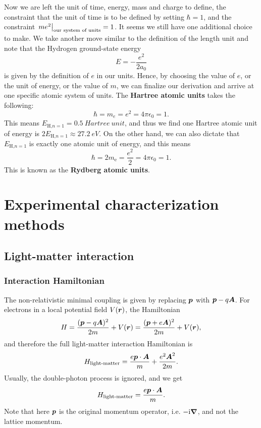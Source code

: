 \documentclass[hyperref, a4paper, 12pt]{report}
\newcommand*{\ii}{\mathrm{i}}
\newcommand*{\concept}[1]{{\textbf{#1}}}
\begin{document}
Now we are left the unit of time, energy, mass and charge to define, 
the constraint that the unit of time is to be defined by setting $\hbar = 1$,
and the constraint $\eval{m e^2}_{\text{our system of units}} = 1$.
It seems we still have one additional choice to make. 
We take another move similar to the definition of the length unit 
and note that the Hydrogen ground-state energy 
\begin{equation}
    E = - \frac{e^2}{2a_0}
\end{equation}
is given by the definition of $e$ in our units.
Hence, by choosing the value of $e$, 
or the unit of energy, or the value of $m$, 
we can finalize our derivation and arrive at one specific atomic system of units.
The \concept{Hartree atomic units} takes the following:
\begin{equation}
    \hbar = m_e = e^2 = 4 \pi \epsilon_0 = 1.
\end{equation}
This means $E_{\text{H,$n=1$}} = \SI{0.5}{Hartree \ unit}$,
and thus we find one Hartree atomic unit of energy 
is $2 E_{\text{H,$n=1$}} \approx \SI{27.2}{eV}$.
On the other hand, we can also dictate that $E_{\text{H,$n=1$}}$
is exactly one atomic unit of energy, 
and this means 
\begin{equation}
    \hbar = 2 m_{\text{e}} = \frac{e^2}{2} = 4 \pi \epsilon_0 = 1.
\end{equation}
This is known as the \concept{Rydberg atomic units}.

\chapter{Experimental characterization methods}

\section{Light-matter interaction}

\subsection{Interaction Hamiltonian}

The non-relativistic minimal coupling is given by replacing $\vb*{p}$ with $\vb*{p} - q \vb*{A}$.
For electrons in a local potential field $V(\vb*{r})$, 
the Hamiltonian 
\begin{equation}
    H = \frac{(\vb*{p} - q \vb*{A})^2}{2m} + V(\vb*{r}) = \frac{(\vb*{p} + e \vb*{A})^2}{2m} + V(\vb*{r}),
\end{equation}
and therefore the full light-matter interaction Hamiltonian is 
\begin{equation}
    H_{\text{light-matter}} = \frac{e \vb*{p} \cdot \vb*{A}}{m} + \frac{e^2 \vb*{A}^2}{2m}.
\end{equation}
Usually, the double-photon process is ignored, and we get 
\begin{equation}
    H_{\text{light-matter}} = \frac{e \vb*{p} \cdot \vb*{A}}{m}.
    \label{eq:light-matter.linear}
\end{equation}
Note that here $\vb*{p}$ is the original momentum operator, i.e. $- \ii \grad$,
and not the lattice momentum.
\end{document}
